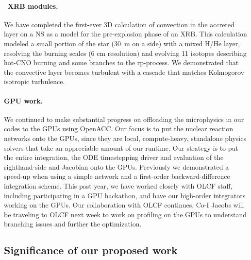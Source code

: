 \documentclass[11pt,letterpaper,english]{article}
\begin{document}
\paragraph{\maestro\ XRB modules.}
%
We have completed the first-ever 3D calculation of convection in the
accreted layer on a NS as a model for the pre-explosion
phase of an XRB.  This calculation modeled a small portion of the star
(30~m on a side) with a mixed H/He layer, resolving the burning scales
(6 cm resolution) and evolving 11 isotopes describing hot-CNO burning
and some branches to the rp-process.  We demonstrated that the
convective layer becomes turbulent with a cascade that matches
Kolmogorov isotropic turbulence.



\paragraph{GPU work.}
%
We continued to make substantial progress on offloading the
microphysics in our codes to the GPUs using OpenACC.  Our focus is to
put the nuclear reaction networks onto the GPUs, since they are local,
compute-heavy, standalone physics solvers that take an appreciable
amount of our runtime. Our strategy is to put the entire integration,
the ODE timestepping driver and evaluation of the righthand-side and
Jacobian onto the GPUs.  Previously we demonstrated a speed-up when
using a simple network and a first-order backward-difference
integration scheme.  This past year, we have worked closely with OLCF
staff, including participating in a GPU hackathon, and have our
high-order integrators working on the GPUs.  Our collaboration
with OLCF continues, Co-I Jacobs will be traveling to OLCF next week
to work on profiling on the GPUs to understand branching issues and
further the optimization.




\subsection{Significance of our proposed work}

\end{document}
